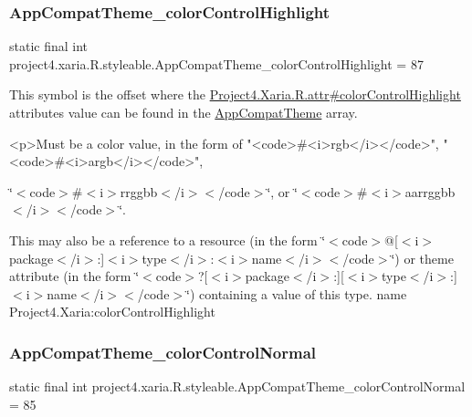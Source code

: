 \subsubsection{\texorpdfstring{App\+Compat\+Theme\+\_\+color\+Control\+Highlight}{AppCompatTheme\_colorControlHighlight}}
{\footnotesize\ttfamily static final int project4.\+xaria.\+R.\+styleable.\+App\+Compat\+Theme\+\_\+color\+Control\+Highlight = 87\hspace{0.3cm}{\ttfamily [static]}}

This symbol is the offset where the \hyperlink{}{Project4.\+Xaria.\+R.\+attr\#color\+Control\+Highlight} attribute\textquotesingle{}s value can be found in the \hyperlink{classproject4_1_1xaria_1_1R_1_1styleable_aad8bec413e2350f9404e6ff0e831a85d}{App\+Compat\+Theme} array.

\begin{DoxyVerb}      <p>Must be a color value, in the form of "<code>#<i>rgb</i></code>", "<code>#<i>argb</i></code>",
\end{DoxyVerb}
 \char`\"{}$<$code$>$\#$<$i$>$rrggbb$<$/i$>$$<$/code$>$\char`\"{}, or \char`\"{}$<$code$>$\#$<$i$>$aarrggbb$<$/i$>$$<$/code$>$\char`\"{}. 

This may also be a reference to a resource (in the form \char`\"{}$<$code$>$@\mbox{[}$<$i$>$package$<$/i$>$\+:\mbox{]}$<$i$>$type$<$/i$>$\+:$<$i$>$name$<$/i$>$$<$/code$>$\char`\"{}) or theme attribute (in the form \char`\"{}$<$code$>$?\mbox{[}$<$i$>$package$<$/i$>$\+:\mbox{]}\mbox{[}$<$i$>$type$<$/i$>$\+:\mbox{]}$<$i$>$name$<$/i$>$$<$/code$>$\char`\"{}) containing a value of this type.  name Project4.\+Xaria\+:color\+Control\+Highlight \mbox{\label{classproject4_1_1xaria_1_1R_1_1styleable_ab2853953a006b42c5c1b2506859cd11f}} 
\subsubsection{\texorpdfstring{App\+Compat\+Theme\+\_\+color\+Control\+Normal}{AppCompatTheme\_colorControlNormal}}
{\footnotesize\ttfamily static final int project4.\+xaria.\+R.\+styleable.\+App\+Compat\+Theme\+\_\+color\+Control\+Normal = 85\hspace{0.3cm}{\ttfamily [static]}}

